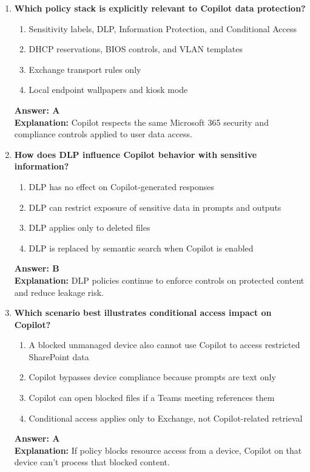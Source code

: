 \documentclass[10pt]{article}
\begin{document}
\begin{enumerate}[leftmargin=*]
\item \textbf{Which policy stack is explicitly relevant to Copilot data protection?}
\begin{enumerate}[label=\Alph*.]
  \item Sensitivity labels, DLP, Information Protection, and Conditional Access
  \item DHCP reservations, BIOS controls, and VLAN templates
  \item Exchange transport rules only
  \item Local endpoint wallpapers and kiosk mode
\end{enumerate}
\textbf{Answer: A}\\
\textbf{Explanation:} Copilot respects the same Microsoft 365 security and compliance controls applied to user data access.

\item \textbf{How does DLP influence Copilot behavior with sensitive information?}
\begin{enumerate}[label=\Alph*.]
  \item DLP has no effect on Copilot-generated responses
  \item DLP can restrict exposure of sensitive data in prompts and outputs
  \item DLP applies only to deleted files
  \item DLP is replaced by semantic search when Copilot is enabled
\end{enumerate}
\textbf{Answer: B}\\
\textbf{Explanation:} DLP policies continue to enforce controls on protected content and reduce leakage risk.

\item \textbf{Which scenario best illustrates conditional access impact on Copilot?}
\begin{enumerate}[label=\Alph*.]
  \item A blocked unmanaged device also cannot use Copilot to access restricted SharePoint data
  \item Copilot bypasses device compliance because prompts are text only
  \item Copilot can open blocked files if a Teams meeting references them
  \item Conditional access applies only to Exchange, not Copilot-related retrieval
\end{enumerate}
\textbf{Answer: A}\\
\textbf{Explanation:} If policy blocks resource access from a device, Copilot on that device can’t process that blocked content.


\end{enumerate}
\end{document}
